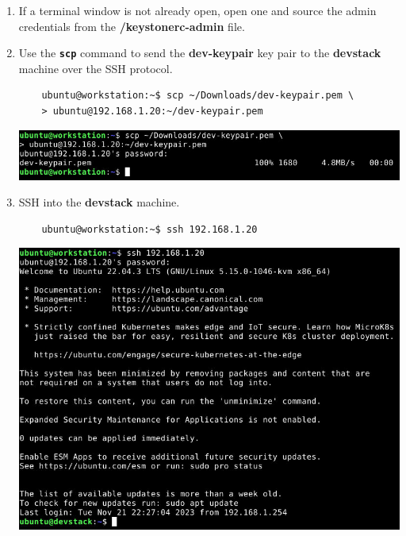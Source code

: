 \documentclass[letterpaper, 12pt]{article}
\begin{document}
\begin{enumerate}
    \item If a terminal window is not already open, open one and source the admin credentials from the 
    \textbf{\texttildemid/keystonerc-admin} file.

    \item Use the \textbf{\texttt{scp}} command to send the \textbf{dev-keypair} key pair to the \textbf{devstack}
    machine over the SSH protocol.
    \begin{lstlisting}
    ubuntu@workstation:~$ scp ~/Downloads/dev-keypair.pem \
    > ubuntu@192.168.1.20:~/dev-keypair.pem
    \end{lstlisting}

    \begin{center}
        \includegraphics[width=\linewidth]{images/part6/step2.png}
    \end{center}

    \item SSH into the \textbf{devstack} machine.
    \begin{lstlisting}
    ubuntu@workstation:~$ ssh 192.168.1.20
    \end{lstlisting}

    \begin{center}
        \includegraphics[width=\linewidth]{images/part6/step3.png}
    \end{center}


\end{enumerate}
\end{document}
